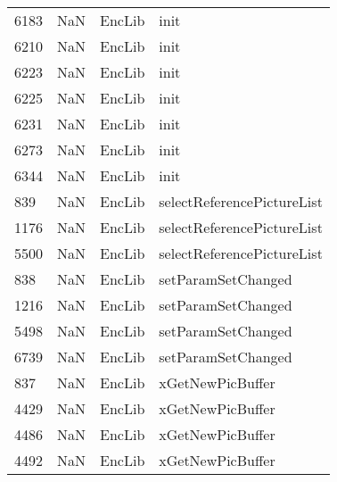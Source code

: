 \begin{tabular}{llll}
6183 &                   NaN &                     EncLib &                                      init \\
6210 &                   NaN &                     EncLib &                                      init \\
6223 &                   NaN &                     EncLib &                                      init \\
6225 &                   NaN &                     EncLib &                                      init \\
6231 &                   NaN &                     EncLib &                                      init \\
6273 &                   NaN &                     EncLib &                                      init \\
6344 &                   NaN &                     EncLib &                                      init \\
839  &                   NaN &                     EncLib &                selectReferencePictureList \\
1176 &                   NaN &                     EncLib &                selectReferencePictureList \\
5500 &                   NaN &                     EncLib &                selectReferencePictureList \\
838  &                   NaN &                     EncLib &                        setParamSetChanged \\
1216 &                   NaN &                     EncLib &                        setParamSetChanged \\
5498 &                   NaN &                     EncLib &                        setParamSetChanged \\
6739 &                   NaN &                     EncLib &                        setParamSetChanged \\
837  &                   NaN &                     EncLib &                          xGetNewPicBuffer \\
4429 &                   NaN &                     EncLib &                          xGetNewPicBuffer \\
4486 &                   NaN &                     EncLib &                          xGetNewPicBuffer \\
4492 &                   NaN &                     EncLib &                          xGetNewPicBuffer \\

\end{tabular}
